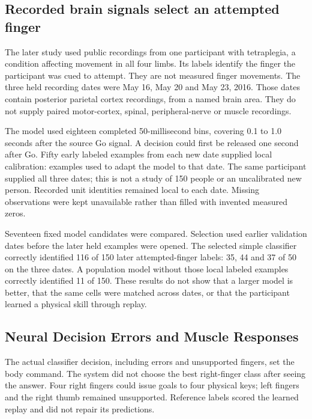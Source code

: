 \subsection{Recorded brain signals select an attempted finger}

The later study used public recordings from one participant with tetraplegia,
a condition affecting movement in all four limbs. Its labels identify the finger
the participant was cued to attempt. They are not measured finger movements.
The three held recording dates were May 16, May 20 and May 23, 2016. Those dates
contain posterior parietal cortex recordings, from a named brain area. They do
not supply paired motor-cortex, spinal, peripheral-nerve or muscle recordings.

The model used eighteen completed 50-millisecond bins, covering 0.1 to 1.0 seconds
after the source Go signal. A decision could first be released one second after
Go. Fifty early labeled examples from each new date supplied local calibration:
examples used to adapt the model to that date. The same participant supplied all
three dates; this is not a study of 150 people or an uncalibrated new person.
Recorded unit identities remained local to each date. Missing observations were
kept unavailable rather than filled with invented measured zeros.

Seventeen fixed model candidates were compared. Selection used earlier validation
dates before the later held examples were opened. The selected simple classifier
correctly identified 116 of 150 later attempted-finger labels: 35, 44 and 37 of
50 on the three dates. A population model without those local labeled examples
correctly identified 11 of 150. These results do not show that a larger model is
better, that the same cells were matched across dates, or that the participant
learned a physical skill through replay.

\subsection{Neural Decision Errors and Muscle Responses}

The actual classifier decision, including errors and unsupported fingers, set
the body command. The system did not choose the best right-finger class after
seeing the answer. Four right fingers could issue goals to four physical keys;
left fingers and the right thumb remained unsupported. Reference labels scored
the learned replay and did not repair its predictions.

